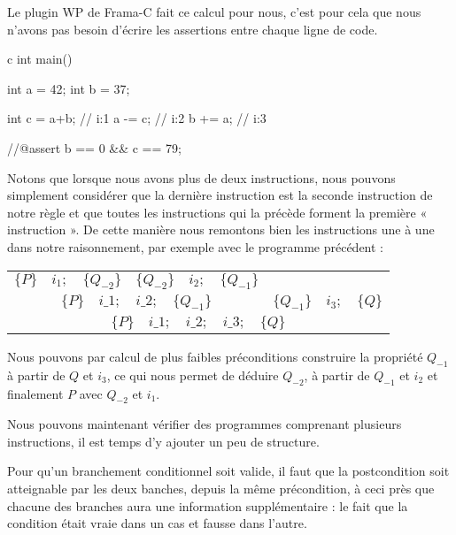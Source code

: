 Le plugin WP de Frama-C fait ce calcul pour nous, c'est pour cela que nous 
n'avons pas besoin d'écrire les assertions entre chaque ligne de code.



\begin{CodeBlock}{c}
int main(){
  int a = 42;
  int b = 37;

  int c = a+b; // i:1
  a -= c;      // i:2
  b += a;      // i:3

  //@assert b == 0 && c == 79;
}
\end{CodeBlock}





Notons que lorsque nous avons plus de deux instructions, nous pouvons simplement
considérer que la dernière instruction est la seconde instruction de notre règle
et que toutes les instructions qui la précède forment la première « instruction ». 
De cette manière nous remontons bien les instructions une à une dans notre
raisonnement, par exemple avec le programme précédent :


\begin{center}
\begin{tabular}{ccc}
  $\{P\}\quad i_1 ; \quad \{Q_{-2}\}$ & $\{Q_{-2}\}\quad i_2 ; \quad \{Q_{-1}\}$ & \\
  \cline{1-2}
  \multicolumn{2}{c}{$\{P\}\quad i\_1 ; \quad i\_2 ; \quad \{Q_{-1}\}$} & $\{Q_{-1}\} \quad i_3 ; \quad \{Q\}$\\
  \hline
  \multicolumn{3}{c}{$\{P\}\quad i\_1 ; \quad i\_2 ; \quad i\_3; \quad \{ Q \}$}
\end{tabular}
\end{center}

Nous pouvons par calcul de plus faibles préconditions construire la propriété
$Q_{-1}$ à partir de $Q$ et $i_3$, ce qui nous permet de déduire $Q_{-2}$, à 
partir de $Q_{-1}$ et $i_2$ et finalement $P$ avec $Q_{-2}$ et $i_1$.



Nous pouvons maintenant vérifier des programmes comprenant plusieurs 
instructions, il est temps d'y ajouter un peu de structure.





Pour qu'un branchement conditionnel soit valide, il faut que la postcondition
soit atteignable par les deux banches, depuis la même précondition, à ceci 
près que chacune des branches aura une information supplémentaire : le fait 
que la condition était vraie dans un cas et fausse dans l'autre.



